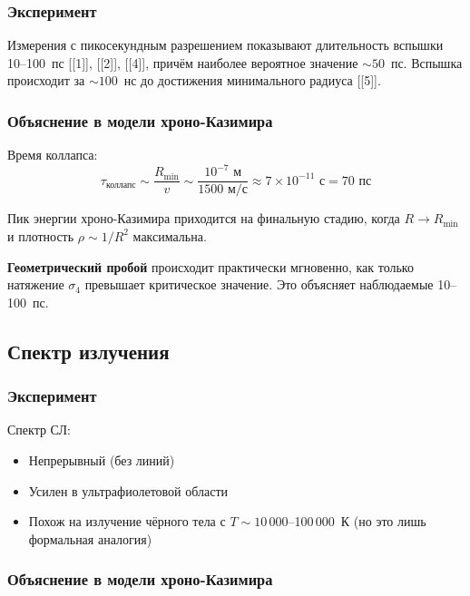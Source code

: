 \documentclass[12pt,a4paper]{article}
\begin{document}
\subsubsection{Эксперимент}

Измерения с пикосекундным разрешением показывают длительность вспышки 10--100~пс [[1]], [[2]], [[4]], причём наиболее вероятное значение $\sim 50$~пс. Вспышка происходит за $\sim 100$~нс до достижения минимального радиуса [[5]].

\subsubsection{Объяснение в модели хроно-Казимира}

Время коллапса:
\begin{equation}
\tau_{\text{коллапс}} \sim \frac{R_{\text{min}}}{v} \sim \frac{10^{-7} \text{ м}}{1500 \text{ м/с}} \approx 7 \times 10^{-11} \text{ с} = 70 \text{ пс}
\end{equation}

Пик энергии хроно-Казимира приходится на финальную стадию, когда $R \to R_{\text{min}}$ и плотность $\rho \sim 1/R^2$ максимальна.

\textbf{Геометрический пробой} происходит практически мгновенно, как только натяжение $\sigma_4$ превышает критическое значение. Это объясняет наблюдаемые 10--100~пс.

\subsection{Спектр излучения}

\subsubsection{Эксперимент}

Спектр СЛ:
\begin{itemize}
    \item Непрерывный (без линий)
    \item Усилен в ультрафиолетовой области
    \item Похож на излучение чёрного тела с $T \sim 10\,000$--100\,000~К (но это лишь формальная аналогия)
\end{itemize}

\subsubsection{Объяснение в модели хроно-Казимира}
\end{document}
